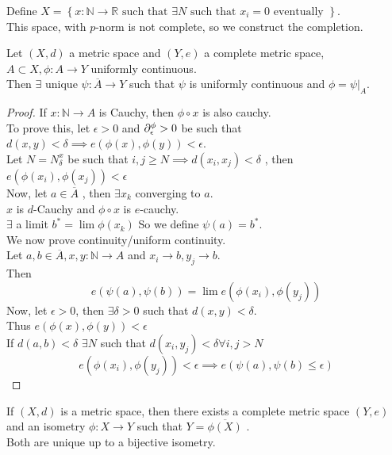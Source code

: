 \documentclass[../main.tex]{subfiles}
\begin{document}
Define $X= \left\{ x: \mathbb{N}\to \mathbb{R} \text{ such that } \exists N \text{ such that } x_i =0 \text{ eventually }  \right\} $.\\
This space, with $p$-norm is not complete, so we construct the completion.
\begin{propo}
Let $( X,d) $ a metric space and $( Y,e) $ a complete metric space, $A \subset X, \phi:A\to Y$ uniformly continuous.\\
Then $\exists $ unique $\psi: \overline{A}\to Y$ such that $\psi$ is uniformly continuous and $\phi= \psi|_A$.
\end{propo}
\begin{proof}
If $x: \mathbb{N}\to A$ is Cauchy, then $\phi\circ x$ is also cauchy.\\
To prove this, let $\epsilon>0$ and $\partial_\epsilon^{\phi}>0$ be such that $d( x,y) < \delta\implies e( \phi( x) ,\phi( y) ) < \epsilon$.\\
Let $N= N_\delta^{x} $ be such that $i,j \geq N\implies d( x_i,x_j) < \delta$ , then $e( \phi( x_i) ,\phi( x_j) ) < \epsilon$ \\

Now, let $a\in \overline{A}$ , then $\exists x_k$ converging to $a$.\\
$x$ is $d$-Cauchy and $\phi\circ x$ is $e$-cauchy.\\
$\exists$ a limit $b^{\ast}= \lim\phi( x_k ) $ 
So we define $\psi( a) = b^{\ast}$.\\
We now prove continuity/uniform continuity.\\
Let $a,b \in \overline{A}, x,y: \mathbb{N}\to A$ and $x_i\to b, y_j \to b$.\\
Then
\[ 
e( \psi( a) , \psi( b) ) =\lim e( \phi( x_i) ,\phi( y_j) ) 
\]
Now, let $\epsilon>0$, then $\exists \delta>0$ such that $d( x,y) < \delta$.\\
Thus $e( \phi( x) ,\phi( y) ) < \epsilon$ \\
If $d( a,b) < \delta$ $\exists N$ such that $d( x_i,y_j) < \delta \forall i,j >N$ 
\[ 
e( \phi( x_i) ,\phi( y_j) ) < \epsilon \implies e( \psi( a) ,\psi( b) \leq \epsilon) 
\]
\end{proof}
\begin{thm}
	If $( X,d) $ is a metric space, then there exists a complete metric space $( Y,e) $ and an isometry $\phi:X\to Y$ such that $Y= \overline{\phi( X) }$ .\\
	Both are unique up to a bijective isometry.
\end{thm}
\end{document}
